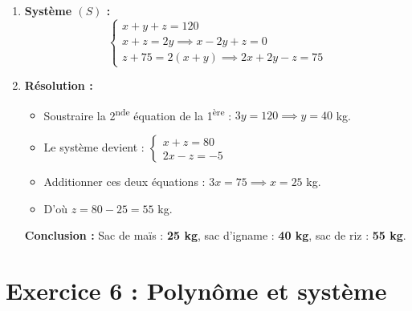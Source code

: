 \documentclass[12pt,a4paper]{article}
\begin{document}
\begin{enumerate}
    \item \textbf{Système $(S)$ :}
    \[
    \begin{cases}
    x + y + z = 120 \\
    x + z = 2y \implies x - 2y + z = 0 \\
    z + 75 = 2(x + y) \implies 2x + 2y - z = 75
    \end{cases}
    \]

    \item \textbf{Résolution :}
    \begin{itemize}[label=$\bullet$]
        \item Soustraire la 2\textsuperscript{nde} équation de la 1\textsuperscript{ère} : $3y = 120 \implies y = 40$ kg.
        \item Le système devient :
        $\begin{cases} x + z = 80 \\ 2x - z = -5 \end{cases}$
        \item Additionner ces deux équations : $3x = 75 \implies x = 25$ kg.
        \item D'où $z = 80 - 25 = 55$ kg.
    \end{itemize}
    \textbf{Conclusion :} Sac de maïs : \textbf{25 kg}, sac d'igname : \textbf{40 kg}, sac de riz : \textbf{55 kg}.
\end{enumerate}

\vspace{0.3cm}

\section*{Exercice 6 : Polynôme et système}
\end{document}
